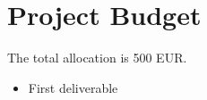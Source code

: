 \documentclass[11pt,a4paper]{article}
\begin{document}
\section{Project Budget}

The total allocation is 500 EUR.

\begin{itemize}
\item First deliverable
\end{itemize}
\end{document}

